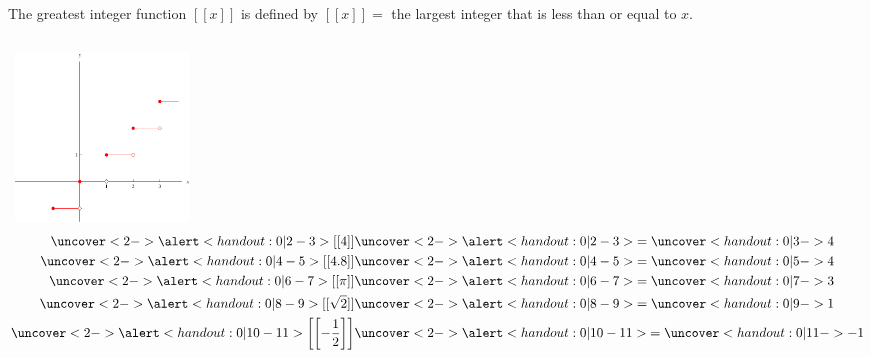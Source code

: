 \begin{frame}
\begin{definition}
The greatest integer function $[[x]]$ is defined by $[[x]] =$ the largest integer that is less than or equal to $x$.
\end{definition}
\begin{columns}[c]
\ \includegraphics[height=4.5cm]{continuity/pictures/02-05-ex2d.pdf}%
\begin{align*}
\uncover<2->{%
\alert<handout:0| 2-3>{%
[[%
4%
]]%
}}%
& \uncover<2->{%
\alert<handout:0| 2-3>{%
 = \uncover<handout:0| 3->{%
 4%
}}}\\%
\uncover<2->{%
\alert<handout:0| 4-5>{%
[[%
4.8%
]]%
}}%
& \uncover<2->{%
\alert<handout:0| 4-5>{%
 = \uncover<handout:0| 5->{%
 4%
}}}\\%
\uncover<2->{%
\alert<handout:0| 6-7>{%
[[%
\pi%
]]%
}}%
& \uncover<2->{%
\alert<handout:0| 6-7>{%
 = \uncover<handout:0| 7->{%
 3%
}}}\\%
\uncover<2->{%
\alert<handout:0| 8-9>{%
[[%
\sqrt{2}%
]]%
}}%
& \uncover<2->{%
\alert<handout:0| 8-9>{%
 = \uncover<handout:0| 9->{%
 1%
}}}\\%
\uncover<2->{%
\alert<handout:0| 10-11>{%
\left[\left[%
-\frac{1}{2}%
\right]\right]%
}}%
& \uncover<2->{%
\alert<handout:0| 10-11>{%
 = \uncover<handout:0| 11->{%
-1%
}}}%
\end{align*}
\end{columns}
\end{frame}
